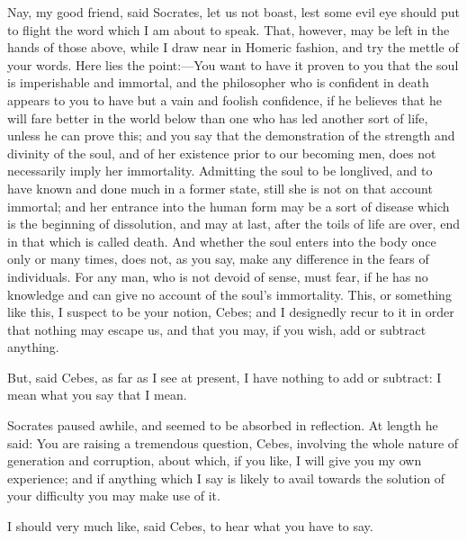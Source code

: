 \documentclass[11pt,letter]{article}
\begin{document}
\par  Nay, my good friend, said Socrates, let us not boast, lest some evil eye should put to flight the word which I am about to speak. That, however, may be left in the hands of those above, while I draw near in Homeric fashion, and try the mettle of your words. Here lies the point:—You want to have it proven to you that the soul is imperishable and immortal, and the philosopher who is confident in death appears to you to have but a vain and foolish confidence, if he believes that he will fare better in the world below than one who has led another sort of life, unless he can prove this; and you say that the demonstration of the strength and divinity of the soul, and of her existence prior to our becoming men, does not necessarily imply her immortality. Admitting the soul to be longlived, and to have known and done much in a former state, still she is not on that account immortal; and her entrance into the human form may be a sort of disease which is the beginning of dissolution, and may at last, after the toils of life are over, end in that which is called death. And whether the soul enters into the body once only or many times, does not, as you say, make any difference in the fears of individuals. For any man, who is not devoid of sense, must fear, if he has no knowledge and can give no account of the soul's immortality. This, or something like this, I suspect to be your notion, Cebes; and I designedly recur to it in order that nothing may escape us, and that you may, if you wish, add or subtract anything.

\par  But, said Cebes, as far as I see at present, I have nothing to add or subtract: I mean what you say that I mean.

\par  Socrates paused awhile, and seemed to be absorbed in reflection. At length he said: You are raising a tremendous question, Cebes, involving the whole nature of generation and corruption, about which, if you like, I will give you my own experience; and if anything which I say is likely to avail towards the solution of your difficulty you may make use of it.

\par  I should very much like, said Cebes, to hear what you have to say.
\end{document}
